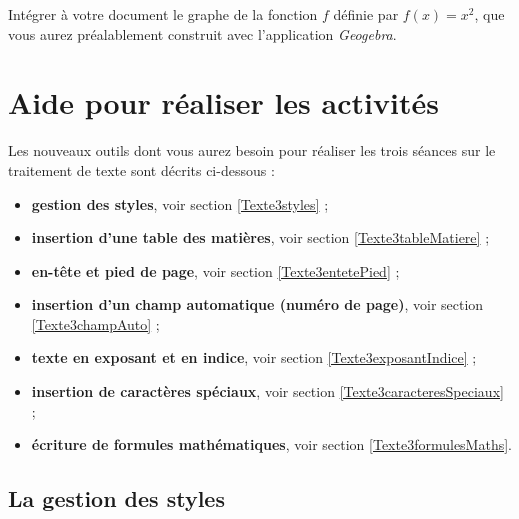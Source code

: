 Intégrer à votre document le graphe de la fonction $f$ définie par $f(x)=x^2$, que vous aurez préalablement construit avec l'application \emph{Geogebra}.

\vfill



\newpage



\section{Aide pour réaliser les activités}\label{aide_seancesWord3}


Les nouveaux outils dont vous aurez besoin pour réaliser les trois séances sur le traitement de texte sont décrits ci-dessous :


\begin{itemize}   
\item \textbf{gestion des styles}, voir section \vref{Texte3styles} ;
\item \textbf{insertion d'une table des matières}, voir section \vref{Texte3tableMatiere} ;
\item \textbf{en-tête et pied de page}, voir section \vref{Texte3entetePied} ;
\item \textbf{insertion d'un champ automatique (numéro de page)}, voir section \vref{Texte3champAuto} ;
\item \textbf{texte en exposant et en indice}, voir section \vref{Texte3exposantIndice} ;
\item \textbf{insertion de caractères spéciaux}, voir section \vref{Texte3caracteresSpeciaux} ; 
\item \textbf{écriture de formules mathématiques}, voir section \vref{Texte3formulesMaths}. 
\end{itemize}  




\subsection{La gestion des styles}\label{Texte3styles}

